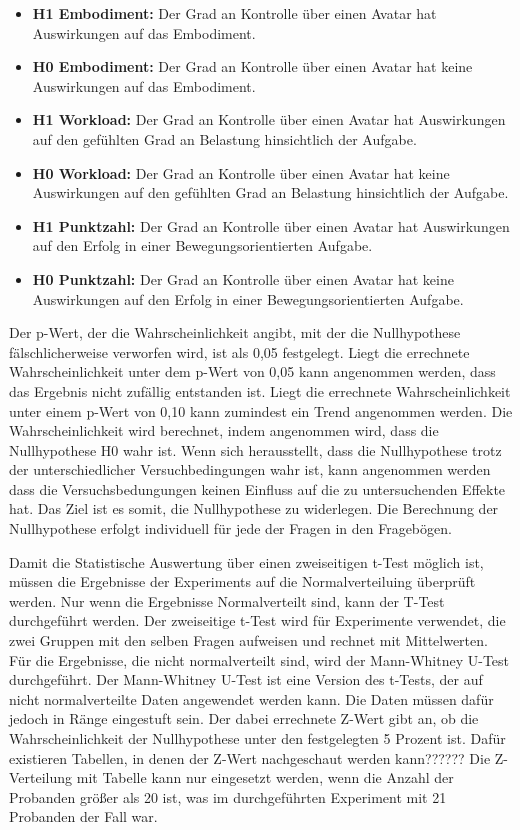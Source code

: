 \begin{itemize} 

\item \textbf{H1 Embodiment:} Der Grad an Kontrolle über einen Avatar hat Auswirkungen auf das Embodiment.
\item \textbf{H0 Embodiment:} Der Grad an Kontrolle über einen Avatar hat keine Auswirkungen auf das Embodiment.

\item \textbf{H1 Workload:} Der Grad an Kontrolle über einen Avatar hat Auswirkungen auf den gefühlten Grad an Belastung hinsichtlich der Aufgabe.
\item \textbf{H0 Workload:} Der Grad an Kontrolle über einen Avatar hat keine Auswirkungen auf den gefühlten Grad an Belastung hinsichtlich der Aufgabe.

\item \textbf{H1 Punktzahl:} Der Grad an Kontrolle über einen Avatar hat Auswirkungen auf den Erfolg in einer Bewegungsorientierten Aufgabe.
\item \textbf{H0 Punktzahl:} Der Grad an Kontrolle über einen Avatar hat keine Auswirkungen auf den Erfolg in einer Bewegungsorientierten Aufgabe.

\end{itemize}

Der p-Wert, der die Wahrscheinlichkeit angibt, mit der die Nullhypothese fälschlicherweise verworfen wird, ist als 0,05 festgelegt.
Liegt die errechnete Wahrscheinlichkeit unter dem p-Wert von 0,05 kann angenommen werden, dass das Ergebnis nicht zufällig entstanden ist. Liegt die errechnete Wahrscheinlichkeit unter einem p-Wert von 0,10 kann zumindest ein Trend angenommen werden.
Die Wahrscheinlichkeit wird berechnet, indem angenommen wird, dass die Nullhypothese H0 wahr ist. Wenn sich herausstellt, dass die Nullhypothese trotz der unterschiedlicher Versuchbedingungen wahr ist, kann angenommen werden dass die Versuchsbedungungen keinen Einfluss auf die zu untersuchenden Effekte hat. Das Ziel ist es somit, die Nullhypothese zu widerlegen.
Die Berechnung der Nullhypothese erfolgt individuell für jede der Fragen in den Fragebögen.

Damit die Statistische Auswertung über einen zweiseitigen t-Test möglich ist, müssen die Ergebnisse der Experiments auf die Normalverteiluing überprüft werden. Nur wenn die Ergebnisse Normalverteilt sind, kann der T-Test durchgeführt werden. Der zweiseitige t-Test wird für Experimente verwendet, die zwei Gruppen mit den selben Fragen aufweisen und rechnet mit Mittelwerten. Für die Ergebnisse, die nicht normalverteilt sind, wird der Mann-Whitney U-Test durchgeführt. Der Mann-Whitney U-Test ist eine Version des t-Tests, der auf nicht normalverteilte Daten angewendet werden kann. Die Daten müssen dafür jedoch in Ränge eingestuft sein. Der dabei errechnete Z-Wert gibt an, ob die Wahrscheinlichkeit der Nullhypothese unter den festgelegten 5 Prozent ist. Dafür existieren Tabellen, in denen der Z-Wert nachgeschaut werden kann?????? Die Z-Verteilung mit Tabelle kann nur eingesetzt werden, wenn die Anzahl der Probanden größer als 20 ist, was im durchgeführten Experiment mit 21 Probanden der Fall war.


